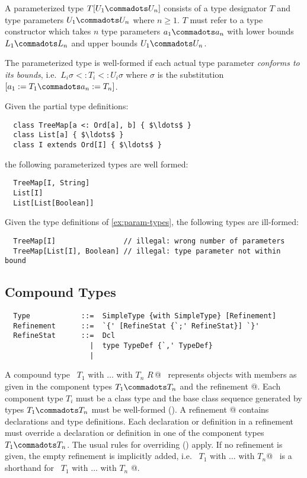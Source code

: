 \documentclass[a4paper,12pt,twoside,titlepage]{book}
\begin{document}
A parameterized type $T[U_1 \commadots U_n]$ consists of a type designator
$T$ and type parameters $U_1 \commadots U_n$ where $n \geq 1$.  $T$
must refer to a type constructor which takes $n$ type parameters $a_1 \commadots a_n$ 
with lower bounds $L_1 \commadots L_n$ and upper bounds $U_1 \commadots U_n$.

The parameterized type is well-formed if each actual type parameter
{\em conforms to its bounds}, i.e.\ $L_i\sigma <: T_i <: U_i\sigma$ where $\sigma$
is the substitution $[a_1 := T_1 \commadots a_n := T_n]$.

\example\label{ex:param-types}
Given the partial type definitions:

\begin{lstlisting}
  class TreeMap[a <: Ord[a], b] { $\ldots$ }
  class List[a] { $\ldots$ }
  class I extends Ord[I] { $\ldots$ }
\end{lstlisting}

the following parameterized types are well formed:

\begin{lstlisting}
  TreeMap[I, String]
  List[I]
  List[List[Boolean]]
\end{lstlisting}

\example Given the type definitions of \ref{ex:param-types},
the following types are ill-formed:

\begin{lstlisting}
  TreeMap[I]                // illegal: wrong number of parameters
  TreeMap[List[I], Boolean] // illegal: type parameter not within bound
\end{lstlisting}

\subsection{Compound Types}
\label{sec:compound-types}

\syntax\begin{lstlisting}
  Type            ::=  SimpleType {with SimpleType} [Refinement]
  Refinement      ::=  `{' [RefineStat {`;' RefineStat}] `}'
  RefineStat      ::=  Dcl
                    |  type TypeDef {`,' TypeDef}
                    |
\end{lstlisting}

A compound type ~\lstinline@$T_1$ with $\ldots$ with $T_n$ {$R\,$}@~  represents
objects with members as given in the component types $T_1 \commadots
T_n$ and the refinement @. Each component type $T_i$ must be a
class type and the base class sequence generated by types $T_1
\commadots T_n$ must be well-formed (). A
refinement @ contains declarations and type
definitions. Each declaration or definition in a refinement must
override a declaration or definition in one of the component types
$T_1 \commadots T_n$. The usual rules for overriding (\sref{})
apply. If no refinement is given, the empty refinement is implicitly
added, i.e. ~\lstinline@$T_1$ with $\ldots$ with $T_n$@~ is a shorthand for
~\lstinline@$T_1$ with $\ldots$ with $T_n$ {}@.
 
\end{document}
